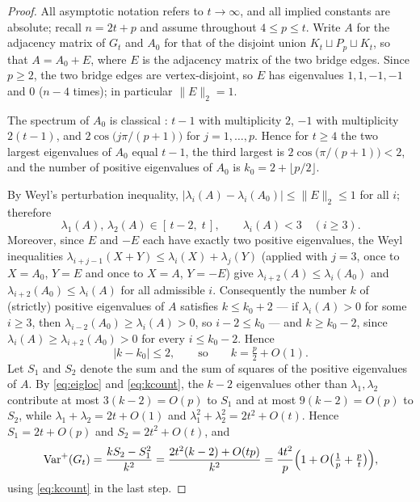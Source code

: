 \documentclass[11pt]{article}
\theoremstyle{remark}
\newcommand{\Varp}{\operatorname{Var}^{+}}
\begin{document}
\begin{proof}
All asymptotic notation refers to $t \to \infty$, and all implied constants
are absolute; recall $n = 2t + p$ and assume throughout $4 \le p \le t$.
Write $A$ for the adjacency matrix of $G_t$ and $A_0$ for that of the
disjoint union $K_t \sqcup P_p \sqcup K_t$, so that $A = A_0 + E$, where $E$
is the adjacency matrix of the two bridge edges. Since $p \ge 2$, the two
bridge edges are vertex-disjoint, so $E$ has eigenvalues $1, 1, -1, -1$ and
$0$ ($n-4$ times); in particular $\lVert E\rVert_2 = 1$.

The spectrum of $A_0$ is classical \cite{BrouwerHaemers2012}: $t-1$ with
multiplicity $2$, $-1$ with multiplicity $2(t-1)$, and
$2\cos\bigl(j\pi/(p+1)\bigr)$ for $j = 1, \dots, p$. Hence for $t \ge 4$ the
two largest eigenvalues of $A_0$ equal $t - 1$, the third largest is
$2\cos\bigl(\pi/(p+1)\bigr) < 2$, and the number of positive eigenvalues of
$A_0$ is $k_0 = 2 + \lfloor p/2 \rfloor$.

By Weyl's perturbation inequality,
$\lvert \lambda_i(A) - \lambda_i(A_0)\rvert \le \lVert E \rVert_2 \le 1$ for
all $i$; therefore
\begin{equation}\label{eq:eigloc}
\lambda_1(A),\, \lambda_2(A) \in [\,t-2,\; t\,],
\qquad
\lambda_i(A) < 3 \quad (i \ge 3).
\end{equation}
Moreover, since $E$ and $-E$ each have exactly two positive eigenvalues, the
Weyl inequalities $\lambda_{i+j-1}(X+Y) \le \lambda_i(X) + \lambda_j(Y)$
(applied with $j = 3$, once to $X = A_0$, $Y = E$ and once to $X = A$,
$Y = -E$) give
$\lambda_{i+2}(A) \le \lambda_i(A_0)$ and
$\lambda_{i+2}(A_0) \le \lambda_i(A)$ for all admissible $i$. Consequently
the number $k$ of (strictly) positive eigenvalues of $A$ satisfies
$k \le k_0 + 2$ --- if $\lambda_i(A) > 0$ for some $i \ge 3$, then
$\lambda_{i-2}(A_0) \ge \lambda_i(A) > 0$, so $i - 2 \le k_0$ --- and
$k \ge k_0 - 2$, since $\lambda_i(A) \ge \lambda_{i+2}(A_0) > 0$ for every
$i \le k_0 - 2$. Hence
\begin{equation}\label{eq:kcount}
\lvert k - k_0 \rvert \le 2, \qquad\text{so}\qquad k = \tfrac{p}{2} + O(1).
\end{equation}
Let $S_1$ and $S_2$ denote the sum and the sum of squares of the positive
eigenvalues of $A$. By \eqref{eq:eigloc} and \eqref{eq:kcount}, the $k - 2$
eigenvalues other than $\lambda_1, \lambda_2$ contribute at most $3(k-2) =
O(p)$ to $S_1$ and at most $9(k-2) = O(p)$ to $S_2$, while
$\lambda_1 + \lambda_2 = 2t + O(1)$ and
$\lambda_1^2 + \lambda_2^2 = 2t^2 + O(t)$. Hence
$S_1 = 2t + O(p)$ and $S_2 = 2t^2 + O(t)$, and
\begin{equation}\label{eq:var}
\Varp(G_t)
= \frac{k S_2 - S_1^2}{k^2}
= \frac{2t^2 (k-2) + O(tp)}{k^2}
= \frac{4t^2}{p}\Bigl(1 + O\bigl(\tfrac1p + \tfrac{p}{t}\bigr)\Bigr),
\end{equation}
using \eqref{eq:kcount} in the last step.


\end{proof}
\end{document}
